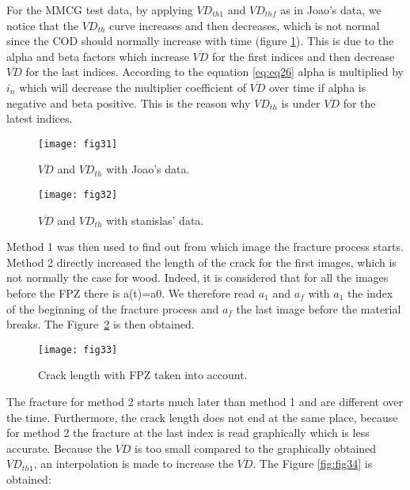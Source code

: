 For the MMCG test data, by applying $VD_{th1}$ and $VD_{thf}$ as in Joao's data, we notice that the $VD_{th}$ curve increases and then decreases, which is not normal since the COD should normally increase with time (figure \ref{fig:fig32}). This is due to the alpha and beta factors which increase $\overline{VD}$ for the first indices and then decrease $\overline{VD}$ for the last indices. According to the equation \ref{eq:eq26} alpha is multiplied by $i_n$ which will decrease the multiplier coefficient of $\overline{VD}$ over time if alpha is negative and beta positive. This is the reason why $VD_{th}$ is under $\overline{VD}$  for the latest indices.

\begin{figure}[htp]
	\begin{minipage}[c]{.46\linewidth}
		\centering
		\texttt{[image: fig31]}
		\caption{$\overline{VD}$ and $VD_{th}$ with Joao's data.}
		\label{fig:fig31}
	\end{minipage}
	\hfill%
	\begin{minipage}[c]{.46\linewidth}
		\centering
		\texttt{[image: fig32]}
		\caption{$\overline{VD}$ and $VD_{th}$ with stanislas' data.}
		\label{fig:fig32}
	\end{minipage}
\end{figure}


Method 1 was then used to find out from which image the fracture process starts. Method 2 directly increased the length of the crack for the first images, which is not normally the case for wood.  Indeed, it is considered that for all the images before the FPZ there is a(t)=a0. We therefore read $a_1$ and $a_f$ with $a_1$ the index of the beginning of the fracture process and $a_f$ the last image before the material breaks. The Figure~\ref{fig:fig33} is then obtained.


\begin{figure}[htp]
	\centering
	\texttt{[image: fig33]}
	\caption{Crack length with FPZ taken into account.}
	\label{fig:fig33}
\end{figure}

The fracture for method 2 starts much later than method 1 and are different over the time. Furthermore, the crack length does not end at the same place, because for method 2 the fracture at the last index is read graphically which is less accurate.
Because the $\overline{VD}$ is too small compared to the graphically obtained $VD_{th1}$, an interpolation is made to increase the $\overline{VD}$. The Figure \ref{fig:fig34} is obtained:

